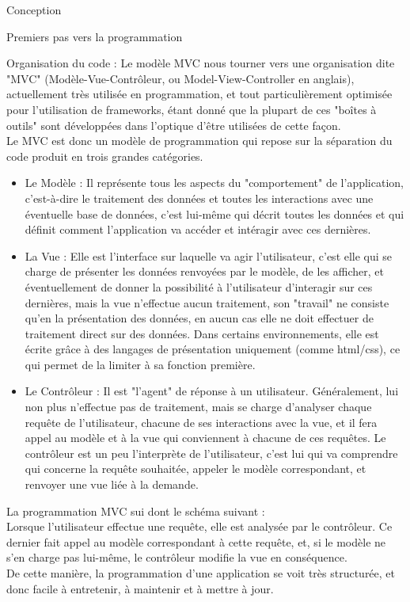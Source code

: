 \documentclass[a4paper, 12pt]{report}
\begin{document}
\begin{part}{Conception}
\begin{chapter}{Premiers pas vers la programmation}
\begin{section}{Organisation du code : Le modèle MVC}
				nous tourner vers une organisation dite "MVC" (Modèle-Vue-Contrôleur, ou Model-View-Controller en anglais), actuellement très 
				utilisée en programmation, et tout particulièrement optimisée pour l'utilisation de frameworks, étant donné que la plupart de 
				ces "boîtes à outils" sont développées dans l'optique d'être utilisées de cette façon.\\
				Le MVC est donc un modèle de programmation qui repose sur la séparation du code produit en trois grandes catégories.\\
				\begin{itemize}
					\item Le Modèle : Il représente tous les aspects du "comportement" de l'application, c'est-à-dire le traitement des données
					et toutes les interactions avec une éventuelle base de données, c'est lui-même qui décrit toutes les données et qui 
					définit comment l'application va accéder et intéragir avec ces dernières.
					\item La Vue : Elle est l'interface sur laquelle va agir l'utilisateur, c'est elle qui se charge de présenter les données
					renvoyées par le modèle, de les afficher, et éventuellement de donner la possibilité à l'utilisateur d'interagir sur 
					ces dernières, mais la vue n'effectue aucun traitement, son "travail" ne consiste qu'en la présentation des données, 
					en aucun cas elle ne doit effectuer de traitement direct sur des données. Dans certains environnements, elle est écrite 
					grâce à des langages de présentation uniquement (comme html/css), ce qui permet de la limiter à sa fonction première.
					\item Le Contrôleur : Il est "l'agent" de réponse à un utilisateur. Généralement, lui non plus n'effectue pas de traitement,
					mais se charge d'analyser chaque requête de l'utilisateur, chacune de ses interactions avec la vue, et il fera appel
					au modèle et à la vue qui conviennent à chacune de ces requêtes. Le contrôleur est un peu l'interprète de l'utilisateur,
					c'est lui qui va comprendre qui concerne la requête souhaitée, appeler le modèle correspondant, et renvoyer une vue
					liée à la demande.
				\end{itemize}
				La programmation MVC sui dont le schéma suivant : \\
				Lorsque l'utilisateur effectue une requête, elle est analysée par le contrôleur. Ce dernier fait appel au modèle correspondant à
				cette requête, et, si le modèle ne s'en charge pas lui-même, le contrôleur modifie la vue en conséquence.\\
				De cette manière, la programmation d'une application se voit très structurée, et donc facile à entretenir, à maintenir et à mettre
				à jour.

			\end{section}
		\end{chapter}
	\end{part}
\end{document}
